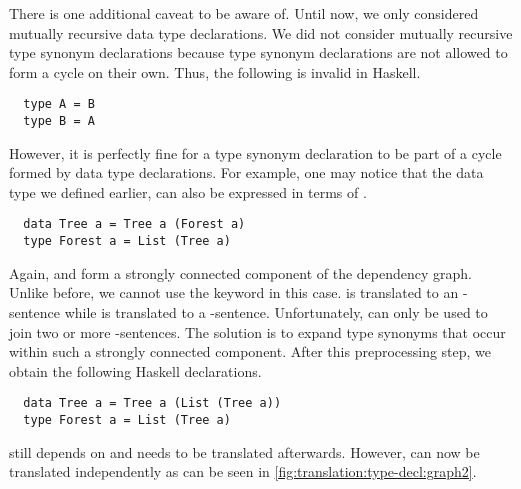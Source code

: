 There is one additional caveat to be aware of.
Until now, we only considered mutually recursive data type declarations.
We did not consider mutually recursive type synonym declarations because type synonym declarations are not allowed to form a cycle on their own.
Thus, the following is invalid in Haskell.
\begin{verbatim}
  type A = B
  type B = A
\end{verbatim}
However, it is perfectly fine for a type synonym declaration to be part of a cycle formed by data type declarations.
For example, one may notice that the  data type we defined earlier, can also be expressed in terms of .
\begin{verbatim}
  data Tree a = Tree a (Forest a)
  type Forest a = List (Tree a)
\end{verbatim}
Again,  and  form a strongly connected component of the dependency graph.
Unlike before, we cannot use the  keyword in this case.
 is translated to an -sentence while  is translated to a -sentence.
Unfortunately,  can only be used to join two or more -sentences.
The solution is to expand type synonyms that occur within such a strongly connected component.
After this preprocessing step, we obtain the following Haskell declarations.
\begin{verbatim}
  data Tree a = Tree a (List (Tree a))
  type Forest a = List (Tree a)
\end{verbatim}
 still depends on  and needs to be translated afterwards.
However,  can now be translated independently as can be seen in \autoref{fig:translation:type-decl:graph2}.

